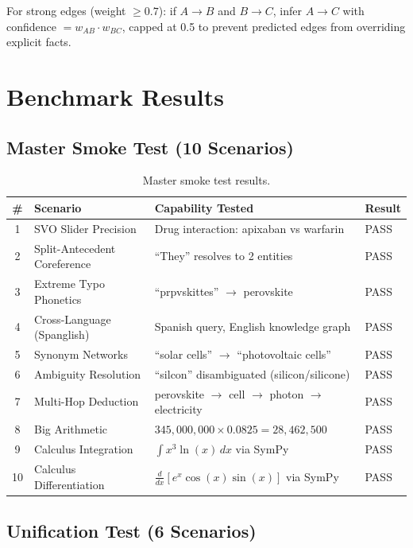 \documentclass[11pt,a4paper]{article}
\begin{document}
For strong edges (weight $\geq 0.7$): if $A \to B$ and $B \to C$, infer $A \to C$ with confidence $= w_{AB} \cdot w_{BC}$, capped at 0.5 to prevent predicted edges from overriding explicit facts.

\section{Benchmark Results}

\subsection{Master Smoke Test (10 Scenarios)}

\begin{table}[ht]
\centering
\caption{Master smoke test results.}
\label{tab:smoke}
\begin{tabular}{@{}clll@{}}
\toprule
\textbf{\#} & \textbf{Scenario} & \textbf{Capability Tested} & \textbf{Result} \\
\midrule
1  & SVO Slider Precision        & Drug interaction: apixaban vs warfarin       & PASS \\
2  & Split-Antecedent Coreference & ``They'' resolves to 2 entities              & PASS \\
3  & Extreme Typo Phonetics      & ``prpvskittes'' $\to$ perovskite              & PASS \\
4  & Cross-Language (Spanglish)  & Spanish query, English knowledge graph        & PASS \\
5  & Synonym Networks            & ``solar cells'' $\to$ ``photovoltaic cells''  & PASS \\
6  & Ambiguity Resolution        & ``silcon'' disambiguated (silicon/silicone)   & PASS \\
7  & Multi-Hop Deduction         & perovskite $\to$ cell $\to$ photon $\to$ electricity & PASS \\
8  & Big Arithmetic              & $345{,}000{,}000 \times 0.0825 = 28{,}462{,}500$ & PASS \\
9  & Calculus Integration        & $\int x^3 \ln(x)\,dx$ via SymPy              & PASS \\
10 & Calculus Differentiation    & $\frac{d}{dx}[e^x \cos(x) \sin(x)]$ via SymPy & PASS \\
\bottomrule
\end{tabular}
\end{table}

\subsection{Unification Test (6 Scenarios)}
\end{document}
